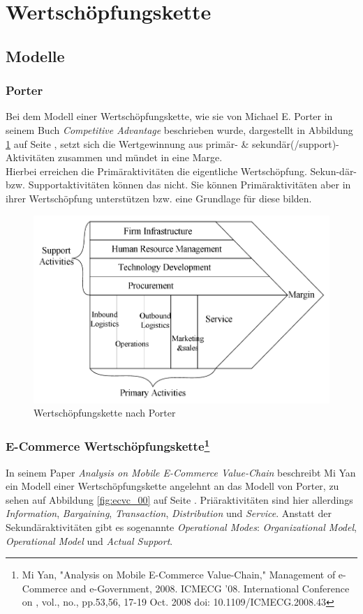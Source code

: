 \clearpage
\section{Wertschöpfungskette}
\subsection{Modelle}
\subsubsection{Porter}
Bei dem Modell einer Wertschöpfungskette, wie sie von Michael E. Porter in seinem Buch \emph{Competitive Advantage} beschrieben wurde, dargestellt in Abbildung \ref{fig:porter_00} auf Seite \pageref{fig:porter_00}, setzt sich die Wertgewinnung aus primär- \& sekundär(/support)-Aktivitäten zusammen und mündet in eine Marge.\\
Hierbei erreichen die Primäraktivitäten die eigentliche Wertschöpfung. Sekun-där- bzw. Supportaktivitäten können das nicht. Sie können Primäraktivitäten aber in ihrer Wertschöpfung unterstützen bzw. eine Grundlage für diese bilden.
\begin{figure}[htb]
\centering
\includegraphics[width=\textwidth]{img/value_chain_porter.png}
\caption{Wertschöpfungskette nach Porter}
\label{fig:porter_00}
\end{figure}
\subsubsection[E-Commerce Wertschöpfungskette]{E-Commerce Wertschöpfungskette\footnote{Mi Yan, "Analysis on Mobile E-Commerce Value-Chain," Management of e-Commerce and e-Government, 2008. ICMECG '08. International Conference on , vol., no., pp.53,56, 17-19 Oct. 2008
doi: 10.1109/ICMECG.2008.43}}
In seinem Paper \emph{Analysis on Mobile E-Commerce Value-Chain} beschreibt Mi Yan ein Modell einer Wertschöpfungskette angelehnt an das Modell von Porter, zu sehen auf Abbildung \ref{fig:ecvc_00} auf Seite \pageref{fig:ecvc_00}. Priäraktivitäten sind hier allerdings \emph{Information}, \emph{Bargaining}, \emph{Transaction}, \emph{Distribution} und \emph{Service}. Anstatt der Sekundäraktivitäten gibt es sogenannte \emph{Operational Modes}: \emph{Organizational Model}, \emph{Operational Model} und \emph{Actual Support}.

